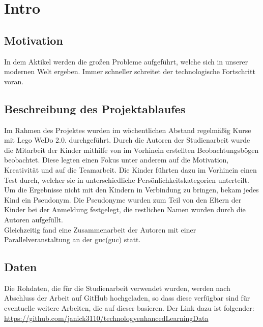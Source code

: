 \chapter{Intro}


\section{Motivation}

In dem Aktikel  werden die großen Probleme aufgeführt, welche sich in unserer modernen Welt ergeben. Immer schneller schreitet der technologische Fortschritt voran.



\section{Beschreibung des Projektablaufes}
Im Rahmen des Projektes wurden im wöchentlichen Abstand regelmäßig Kurse mit Lego WeDo 2.0. durchgeführt. Durch die Autoren der Studienarbeit wurde die Mitarbeit der Kinder mithilfe von im Vorhinein erstellten Beobachtungsbögen beobachtet. Diese legten einen Fokus unter anderem auf die Motivation, Kreativität und auf die Teamarbeit. Die Kinder führten dazu im Vorhinein einen Test durch, welcher sie in unterschiedliche Persönlichkeitskategorien unterteilt. Um die Ergebnisse nicht mit den Kindern in Verbindung zu bringen, bekam jedes Kind ein Pseudonym. Die Pseudonyme wurden zum Teil von den Eltern der Kinder bei der Anmeldung festgelegt, die restlichen Namen wurden durch die Autoren aufgefüllt.\\
Gleichzeitig fand eine Zusammenarbeit der Autoren mit einer Parallelveranstaltung an der \acrlong{guc}(\acrshort{guc}) statt.\\


\section{Daten}
Die Rohdaten, die für die Studienarbeit verwendet wurden, werden nach Abschluss der Arbeit auf GitHub hochgeladen, so dass diese verfügbar sind für eventuelle weitere Arbeiten, die auf dieser basieren. Der Link dazu ist folgender: \url{https://github.com/janick3110/technologyenhancedLearningData}
